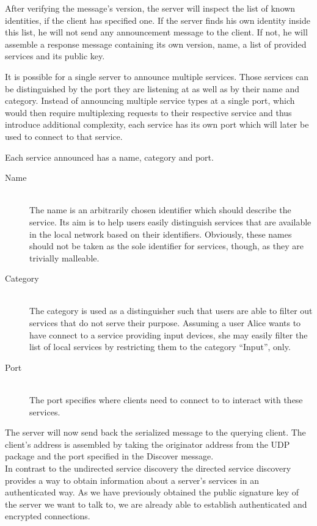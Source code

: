 After verifying the message's version, the server will inspect the list of known identities, if the client has specified one.
If the server finds his own identity inside this list, he will not send any announcement message to the client.
If not, he will assemble a response message containing its own version, name, a list of provided services and its public key.

It is possible for a single server to announce multiple services.
Those services can be distinguished by the port they are listening at as well as by their name and category.
Instead of announcing multiple service types at a single port, which would then require multiplexing requests to their respective service and thus introduce additional complexity, each service has its own port which will later be used to connect to that service.

Each service announced has a name, category and port.
\begin{description}
    \item[Name]\hfill\\
        The name is an arbitrarily chosen identifier which should describe the service.
        Its aim is to help users easily distinguish services that are available in the local network based on their identifiers.
        Obviously, these names should not be taken as the sole identifier for services, though, as they are trivially malleable.
    \item[Category]\hfill\\
        The category is used as a distinguisher such that users are able to filter out services that do not serve their purpose.
        Assuming a user Alice wants to have connect to a service providing input devices, she may easily filter the list of local services by restricting them to the category ``Input'', only.
    \item[Port]\hfill\\
        The port specifies where clients need to connect to to interact with these services.
\end{description}

The server will now send back the serialized message to the querying client.
The client's address is assembled by taking the originator address from the UDP package and the port specified in the Discover message.\\

In contrast to the undirected service discovery the directed service discovery provides a way to obtain information about a server's services in an authenticated way.
As we have previously obtained the public signature key of the server we want to talk to, we are already able to establish authenticated and encrypted connections.

